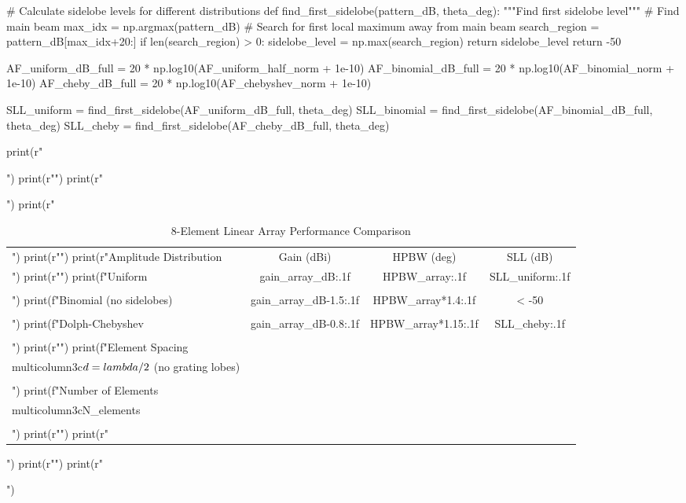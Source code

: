 \documentclass[a4paper, 11pt]{article}
\begin{document}
\begin{pycode}
# Calculate sidelobe levels for different distributions
def find_first_sidelobe(pattern_dB, theta_deg):
    """Find first sidelobe level"""
    # Find main beam
    max_idx = np.argmax(pattern_dB)
    # Search for first local maximum away from main beam
    search_region = pattern_dB[max_idx+20:]
    if len(search_region) > 0:
        sidelobe_level = np.max(search_region)
        return sidelobe_level
    return -50

AF_uniform_dB_full = 20 * np.log10(AF_uniform_half_norm + 1e-10)
AF_binomial_dB_full = 20 * np.log10(AF_binomial_norm + 1e-10)
AF_cheby_dB_full = 20 * np.log10(AF_chebyshev_norm + 1e-10)

SLL_uniform = find_first_sidelobe(AF_uniform_dB_full, theta_deg)
SLL_binomial = find_first_sidelobe(AF_binomial_dB_full, theta_deg)
SLL_cheby = find_first_sidelobe(AF_cheby_dB_full, theta_deg)

print(r"\begin{table}[htbp]")
print(r"\centering")
print(r"\caption{8-Element Linear Array Performance Comparison}")
print(r"\begin{tabular}{lccc}")
print(r"\toprule")
print(r"Amplitude Distribution & Gain (dBi) & HPBW (deg) & SLL (dB) \\")
print(r"\midrule")
print(f"Uniform & {gain_array_dB:.1f} & {HPBW_array:.1f} & {SLL_uniform:.1f} \\\\")
print(f"Binomial (no sidelobes) & {gain_array_dB-1.5:.1f} & {HPBW_array*1.4:.1f} & < -50 \\\\")
print(f"Dolph-Chebyshev & {gain_array_dB-0.8:.1f} & {HPBW_array*1.15:.1f} & {SLL_cheby:.1f} \\\\")
print(r"\midrule")
print(f"Element Spacing & \\multicolumn{{3}}{{c}}{{$d = \\lambda/2$ (no grating lobes)}} \\\\")
print(f"Number of Elements & \\multicolumn{{3}}{{c}}{{{N_elements}}} \\\\")
print(r"\bottomrule")
print(r"\end{tabular}")
print(r"\label{tab:array_comparison}")
print(r"\end{table}")
\end{pycode}
\end{document}
